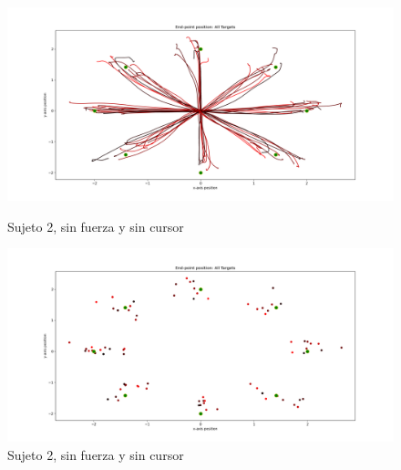 \documentclass[a4paper,11pt, oneside]{book}
\begin{document}
\begin{figure}[H]
	\begin{minipage}[b]{0.5\linewidth}
		\centering
		\includegraphics[width=\linewidth]{sujeto2/no_force_no_cursor/trayectorias}
		\caption{Sujeto 2, sin fuerza y sin cursor}
		\label{fig:figura1}
	\end{minipage}
	\hspace{0.5cm}
	\begin{minipage}[b]{0.5\linewidth}
		\centering
		\includegraphics[width=\linewidth]{sujeto2/no_force_no_cursor/trayectorias_puntos}
		\caption{Sujeto 2, sin fuerza y sin cursor}
		\label{fig:figura2}
	\end{minipage}
\end{figure}
\end{document}
